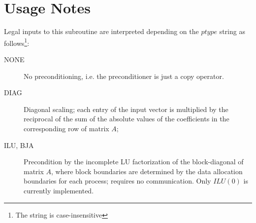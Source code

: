 \section*{Usage Notes}
Legal inputs to this subroutine are interpreted depending on the
$ptype$ string as follows\footnote{The string is case-insensitive}:
\begin{description}
\item[NONE] No preconditioning, i.e. the preconditioner is just a copy
  operator.
\item[DIAG] Diagonal scaling; each entry of the input vector is
  multiplied by the reciprocal of the sum of the absolute values of
  the coefficients in the corresponding row of matrix  $A$;
\item[ILU, BJA] Precondition by the incomplete LU factorization of the
  block-diagonal of matrix $A$, where block boundaries are determined
  by the data allocation boundaries for each process; requires no
  communication. Only $ILU(0)$ is currently implemented. 

\end{description}
